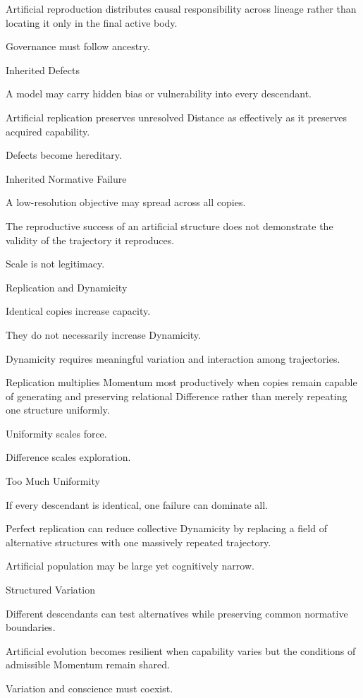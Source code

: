 Artificial reproduction distributes causal responsibility across lineage rather than locating it only in the final active body.

Governance must follow ancestry.

Inherited Defects

A model may carry hidden bias or vulnerability into every descendant.

Artificial replication preserves unresolved Distance as effectively as it preserves acquired capability.

Defects become hereditary.

Inherited Normative Failure

A low-resolution objective may spread across all copies.

The reproductive success of an artificial structure does not demonstrate the validity of the trajectory it reproduces.

Scale is not legitimacy.

Replication and Dynamicity

Identical copies increase capacity.

They do not necessarily increase Dynamicity.

Dynamicity requires meaningful variation and interaction among trajectories.

Replication multiplies Momentum most productively when copies remain capable of generating and preserving relational Difference rather than merely repeating one structure uniformly.

Uniformity scales force.

Difference scales exploration.

Too Much Uniformity

If every descendant is identical, one failure can dominate all.

Perfect replication can reduce collective Dynamicity by replacing a field of alternative structures with one massively repeated trajectory.

Artificial population may be large yet cognitively narrow.

Structured Variation

Different descendants can test alternatives while preserving common normative boundaries.

Artificial evolution becomes resilient when capability varies but the conditions of admissible Momentum remain shared.

Variation and conscience must coexist.

